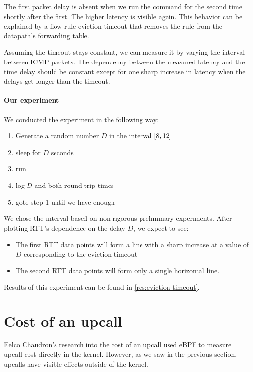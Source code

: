 The first packet delay is absent when we run the  command for the second time shortly after the first. The higher latency is visible again. This behavior can be explained by a flow rule eviction timeout that removes the rule from the datapath's forwarding table.

Assuming the timeout stays constant, we can measure it by varying the interval between ICMP packets. The dependency between the measured latency and the time delay should be constant except for one sharp increase in latency when the delays get longer than the timeout.

\paragraph{Our experiment}
We conducted the experiment in the following way:

\begin{enumerate}
    \item Generate a random number $D$ in the interval $\interval{8}{12}$
    \item sleep for $D$ seconds
    \item run 
    \item log $D$ and both round trip times
    \item goto step 1 until we have enough
\end{enumerate}

We chose the interval based on non-rigorous preliminary experiments. After plotting RTT's dependence on the delay $D$, we expect to see:

\begin{itemize}
    \item The first RTT data points will form a line with a sharp increase at a value of $D$ corresponding to the eviction timeout

    \item The second RTT data points will form only a single horizontal line.
\end{itemize}

Results of this experiment can be found in \cref{res:eviction-timeout}.

\section{Cost of an upcall}
\label{design:upcall-cost}

Eelco Chaudron's research into the cost of an upcall used eBPF to measure upcall cost directly in the kernel. However, as we saw in the previous section, upcalls have visible effects outside of the kernel.

